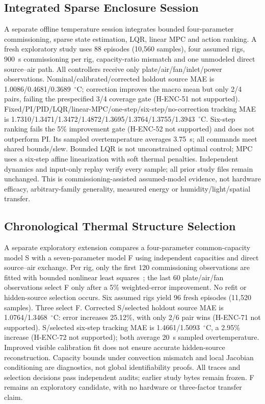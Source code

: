 \documentclass[conference,a4paper]{IEEEtran}
\begin{document}
\subsection{Integrated Sparse Enclosure Session}
A separate offline temperature session integrates bounded four-parameter commissioning, sparse state estimation, LQR, linear MPC and action ranking. A fresh exploratory study uses 88 episodes (10,560 samples), four assumed rigs, 900~s commissioning per rig, capacity-ratio mismatch and one unmodeled direct source--air path. All controllers receive only plate/air/fan/inlet/power observations. Nominal/calibrated/corrected holdout source MAE is 1.0086/\allowbreak{}0.4681/\allowbreak{}0.3689~$^\circ$C; correction improves the macro mean but only 2/4 pairs, failing the prespecified 3/4 coverage gate (H-ENC-51 not supported). Fixed/PI/PID/LQR/linear-MPC/one-step/six-step/no-correction tracking MAE is 1.7310/\allowbreak{}1.3471/\allowbreak{}1.3472/\allowbreak{}1.4872/\allowbreak{}1.3695/\allowbreak{}1.3764/\allowbreak{}1.3755/\allowbreak{}1.3943~$^\circ$C. Six-step ranking fails the 5\% improvement gate (H-ENC-52 not supported) and does not outperform PI. Its sampled overtemperature averages 3.75~s; all commands meet shared bounds/slew. Bounded LQR is not unconstrained optimal control; MPC uses a six-step affine linearization with soft thermal penalties. Independent dynamics and input-only replay verify every sample; all prior study files remain unchanged. This is commissioning-assisted assumed-model evidence, not hardware efficacy, arbitrary-family generality, measured energy or humidity/light/spatial transfer.


\subsection{Chronological Thermal Structure Selection}
A separate exploratory extension compares a four-parameter common-capacity model S with a seven-parameter model F using independent capacities and direct source--air exchange. Per rig, only the first 120 commissioning observations are fitted with bounded nonlinear least squares~\cite{scipyleastsquares}; the last 60 plate/air/fan observations select F only after a 5\% weighted-error improvement. No refit or hidden-source selection occurs. Six assumed rigs yield 96 fresh episodes (11,520 samples). Three select F. Corrected S/selected holdout source MAE is 1.0764/\allowbreak{}1.3468~$^\circ$C: error increases 25.12\%, with only 2/6 pair wins (H-ENC-71 not supported). S/selected six-step tracking MAE is 1.4661/\allowbreak{}1.5093~$^\circ$C, a 2.95\% increase (H-ENC-72 not supported); both average 20~s sampled overtemperature. Improved visible calibration fit does not ensure accurate hidden-source reconstruction. Capacity bounds under convection mismatch and local Jacobian conditioning are diagnostics, not global identifiability proofs. All traces and selection decisions pass independent audits; earlier study bytes remain frozen. F remains an exploratory candidate, with no hardware or three-factor transfer claim.
\end{document}
